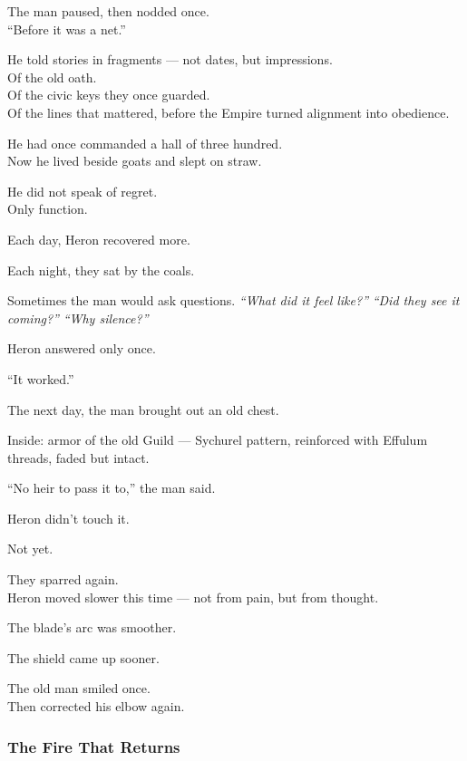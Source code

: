\documentclass[12pt]{article}
\begin{document}
The man paused, then nodded once.\\
“Before it was a net.”

\vspace{1em}

He told stories in fragments — not dates, but impressions.\\
Of the old oath.\\
Of the civic keys they once guarded.\\
Of the lines that mattered, before the Empire turned alignment into obedience.

He had once commanded a hall of three hundred.\\
Now he lived beside goats and slept on straw.

He did not speak of regret.\\
Only function.

\vspace{1em}

Each day, Heron recovered more.

Each night, they sat by the coals.

Sometimes the man would ask questions.  
\textit{“What did it feel like?”}  
\textit{“Did they see it coming?”}  
\textit{“Why silence?”}

Heron answered only once.

“It worked.”

\vspace{1em}

The next day, the man brought out an old chest.

Inside: armor of the old Guild — Sychurel pattern, reinforced with Effulum threads, faded but intact.

“No heir to pass it to,” the man said.

Heron didn’t touch it.

Not yet.

\vspace{1em}

They sparred again.\\
Heron moved slower this time — not from pain, but from thought.

The blade’s arc was smoother.

The shield came up sooner.

The old man smiled once.\\
Then corrected his elbow again.

\dotfill

\subsubsection{The Fire That Returns}
\end{document}
